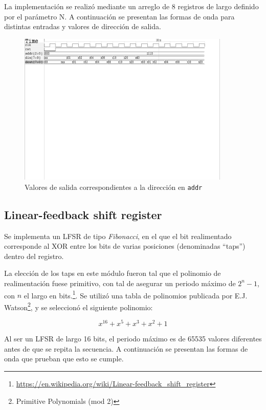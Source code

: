 \documentclass[letterpaper, 12pt]{article}
\numberwithin{equation}{section}
\begin{document}
La implementación se realizó mediante un arreglo de 8 registros de largo definido por el parámetro N. A continuación se presentan las formas de onda para distintas entradas y valores de dirección de salida.

\begin{figure}[H]
  \centering
  \includegraphics[width=0.9\textwidth]{../testbench/asr8/waves_asr8.pdf}
  \caption{Valores de salida correspondientes a la dirección en \texttt{addr}}
\end{figure}

\subsection{Linear-feedback shift register}

Se implementa un LFSR de tipo \emph{Fibonacci}, en el que el bit realimentado corresponde al XOR entre los bits de varias posiciones (denominadas ``taps'') dentro del registro.

La elección de los taps en este módulo fueron tal que el polinomio de realimentación fuese primitivo, con tal de asegurar un periodo máximo de \(2^n-1\), con \(n\) el largo en bits.\footnote{\url{https://en.wikipedia.org/wiki/Linear-feedback_shift_register}}. Se utilizó una tabla de polinomios publicada por E.J. Watson\footnote{Primitive Polynomials (mod 2)}, y se seleccionó el siguiente polinomio:

\begin{equation}
  x^{16}+x^{5}+x^{3}+x^{2}+1
\end{equation}

Al ser un LFSR de largo 16 bits, el periodo máximo es de 65535 valores diferentes antes de que se repita la secuencia. A continuación se presentan las formas de onda que prueban que esto se cumple.
\end{document}

